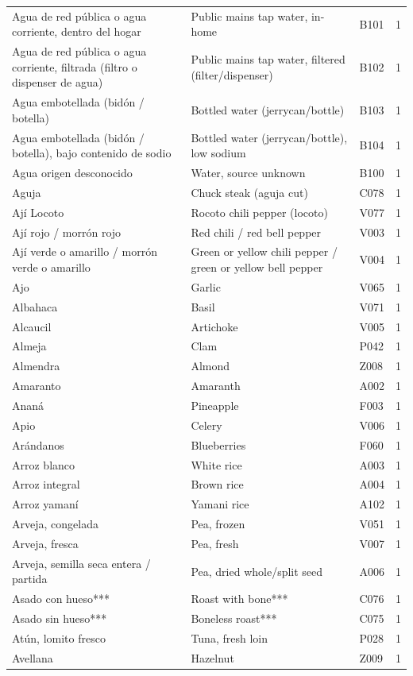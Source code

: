{\begin{longtable}{p{4.3cm}p{5.5cm}p{1.5cm}p{0.7cm}}
Agua de red pública o agua corriente, dentro del hogar & Public mains tap water, in-home & B101 & 1\\
Agua de red pública o agua corriente, filtrada (filtro o dispenser de agua) & Public mains tap water, filtered (filter/dispenser) & B102 & 1\\
Agua embotellada (bidón / botella) & Bottled water (jerrycan/bottle) & B103 & 1\\
Agua embotellada (bidón / botella), bajo contenido de sodio & Bottled water (jerrycan/bottle), low sodium & B104 & 1\\
Agua origen desconocido & Water, source unknown & B100 & 1\\
Aguja & Chuck steak (aguja cut) & C078 & 1\\
Ají Locoto & Rocoto chili pepper (locoto) & V077 & 1\\
Ají rojo / morrón rojo & Red chili / red bell pepper & V003 & 1\\
Ají verde o amarillo / morrón verde o amarillo & Green or yellow chili pepper / green or yellow bell pepper & V004 & 1\\
Ajo & Garlic & V065 & 1\\
Albahaca & Basil & V071 & 1\\
Alcaucil & Artichoke & V005 & 1\\
Almeja & Clam & P042 & 1\\
Almendra & Almond & Z008 & 1\\
Amaranto & Amaranth & A002 & 1\\
Ananá & Pineapple & F003 & 1\\
Apio & Celery & V006 & 1\\
Arándanos & Blueberries & F060 & 1\\
Arroz blanco & White rice & A003 & 1\\
Arroz integral & Brown rice & A004 & 1\\
Arroz yamaní & Yamani rice & A102 & 1\\
Arveja, congelada & Pea, frozen & V051 & 1\\
Arveja, fresca & Pea, fresh & V007 & 1\\
Arveja, semilla seca entera / partida & Pea, dried whole/split seed & A006 & 1\\
Asado con hueso*** & Roast with bone*** & C076 & 1\\
Asado sin hueso*** & Boneless roast*** & C075 & 1\\
Atún, lomito fresco & Tuna, fresh loin & P028 & 1\\
Avellana & Hazelnut & Z009 & 1\\

\end{longtable}}
